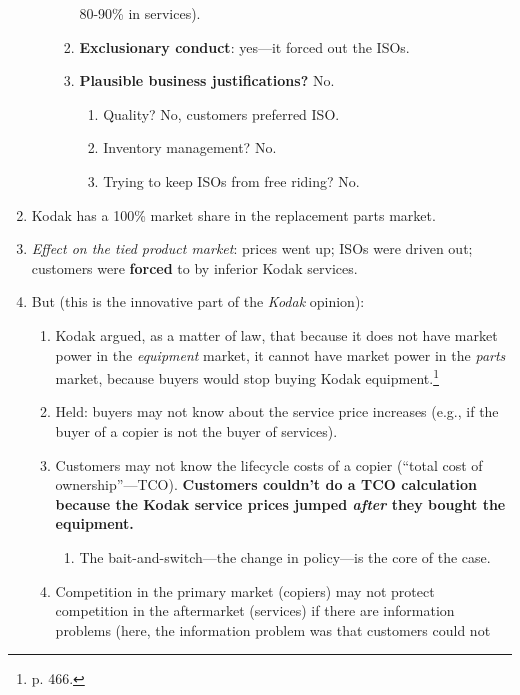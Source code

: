 \begin{enumerate}
\begin{enumerate}
\begin{enumerate}
            80-90\% in services).
            \item \textbf{Exclusionary conduct}: yes---it forced out the ISOs.
            \item \textbf{Plausible business justifications?} No.
            \begin{enumerate}
                \item Quality? No, customers preferred ISO.
                \item Inventory management? No.
                \item Trying to keep ISOs from free riding? No.
            \end{enumerate}
        \end{enumerate}
    \end{enumerate}
    \item Kodak has a 100\% market share in the replacement parts market.
    \item \emph{Effect on the tied product market}: prices went up; ISOs 
    were driven out; customers were \textbf{forced} to by inferior Kodak 
    services.
    \item But (this is the innovative part of the \emph{Kodak} opinion):
    \begin{enumerate}
        \item Kodak argued, as a matter of law, that because it does not 
        have market power in the \emph{equipment} market, it cannot have 
        market power in the \emph{parts} market, because buyers would stop 
        buying Kodak equipment.\footnote{p. 466.} 
        \item Held: buyers may not know about the service price increases 
        (e.g., if the buyer of a copier is not the buyer of services).
        \item Customers may not know the lifecycle costs of a copier 
        (``total cost of ownership''---TCO). \textbf{Customers couldn't do 
        a TCO calculation because the Kodak service prices jumped 
        \emph{after} they bought the equipment.}
        \begin{enumerate}
            \item The bait-and-switch---the change in policy---is the core 
            of the case.
        \end{enumerate}
        \item Competition in the primary market (copiers) may not protect 
        competition in the aftermarket (services) if there are information 
        problems (here, the information problem was that customers could not 

\end{enumerate}
\end{enumerate}

